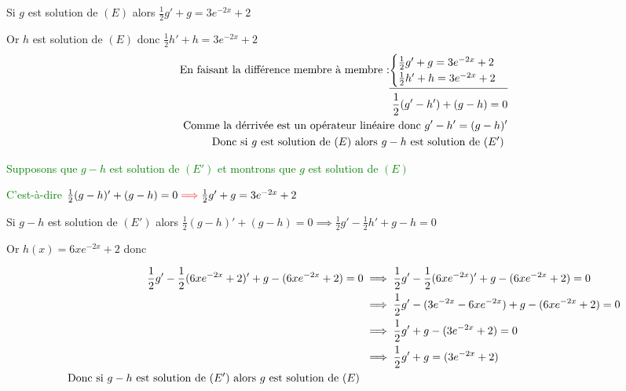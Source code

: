\documentclass[12pt]{article}
\begin{document}
\begin{enumerate}[label=\arabic*)]
\begin{enumerate}[label=\alph*)]
Si \( g \) est solution de \( (E) \) alors \( \frac{1}{2}g'+g = 3e^{-2x}+2  \) 

Or \( h \) est solution de \( (E) \) donc \( \frac{1}{2}h'+h= 3e^{-2x}+2 \)
  				        \begin{align*}
  				         \text{En faisant la différence membre à membre :}
                   \underline{
                   \begin{cases}
  				        	 \frac{1}{2}g'+g = 3e^{-2x}+2\\
  				        	 \frac{1}{2}h'+h= 3e^{-2x}+2
  				        	\end{cases} }\\
\frac{1}{2}(g'-h')+(g-h)=0\\ 
\text{ Comme la dérrivée est un opérateur linéaire donc \( g'-h'=(g-h)' \)}\\
\text{Donc si \( g \) est solution de \( (E) \) alors \( g-h \) est solution de \( (E') \) }
  				        \end{align*}
  				         
         \textcolor{green}{Supposons que \( g-h \) est solution de \( (E') \) et montrons que \( g \) est solution de \( (E) \)}

	   \textcolor{green}{C'est-à-dire  \( \frac{1}{2}(g-h)'+(g-h)=0  \textcolor{red}{\implies} \frac{1}{2}g'+g = 3e^{-2x}+2\)}         
         
Si \( g-h \) est solution de \( (E') \) alors \( \frac{1}{2}(g-h)'+(g-h) = 0 \implies \frac{1}{2}g'-\frac{1}{2}h'+g-h = 0 \) 

Or \( h(x)=6xe^{-2x}+2 \) donc 

\begin{align*}
\frac{1}{2}g'-\frac{1}{2}(6xe^{-2x}+2)'+g-(6xe^{-2x}+2) = 0 & \implies \frac{1}{2}g'-\frac{1}{2}(6xe^{-2x})'+g-(6xe^{-2x}+2) =0\\
&\implies\frac{1}{2}g'-(3e^{-2x}-6xe^{-2x})+g-(6xe^{-2x}+2) =0\\
&\implies\frac{1}{2}g'+g-(3e^{-2x}+2)=0\\
&\implies\frac{1}{2}g'+g=(3e^{-2x}+2)\\
\text{Donc si \( g-h \) est solution de \( (E') \) alors \( g \) est solution de \( (E) \) }  
\end{align*}				        
    \end{enumerate}
\end{enumerate}
\end{document}
